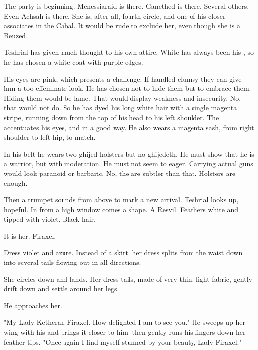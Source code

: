 \begin{comment}
\subsection{Party begins}
\end{comment}
\new
The party is beginning. 
Menessiaraid is there. 
Ganethed is there. 
Several others. 
Even Achsah is there. 
She is, after all, fourth circle, and one of his closer associates in the Cabal. 
It would be rude to exclude her, even though she is a Beuzed. 

Teshrial has given much thought to his own attire. 
White has always been his \colour, so he has chosen a white coat with purple edges. 

His eyes are pink, which presents a challenge. 
If handled clumsy they can give him a too effeminate look. 
He has chosen not to hide them but to embrace them. 
Hiding them would be lame. 
That would display weakness and insecurity.
No, that would not do.
So he has dyed his long white hair with a single magenta stripe, running down from the top of his head to his left shoulder. 
The \colour accentuates his eyes, and in a good way. 
He also wears a magenta sash, from right shoulder to left hip, to match. 

In his belt he wears two ghijed holsters but no ghijedeth. 
He must show that he is a warrior, but with moderation. 
He must not seem to eager. 
Carrying actual guns would look paranoid or barbaric. 
No, the \CiriathSepher are subtler than that. 
Holsters are enough.

Then a trumpet sounds from above to mark a new arrival. 
Teshrial looks up, hopeful. 
In from a high window comes a shape. 
A Resvil. 
Feathers white and tipped with violet. 
Black hair. 

It is her. 
Firaxel. 

Dress violet and azure. 
Instead of a skirt, her dress splits from the waist down into several tails flowing out in all directions. 

She circles down and lands. 
Her dress-tails, made of very thin, light fabric, gently drift down and settle around her legs. 

He approaches her. 

"My Lady Ketheran Firaxel. 
 How delighted I am to see you."
He sweeps up her wing with his and brings it closer to him, then gently runs his fingers down her feather-tips.
"Once again I find myself stunned by your beauty, Lady Firaxel." 

